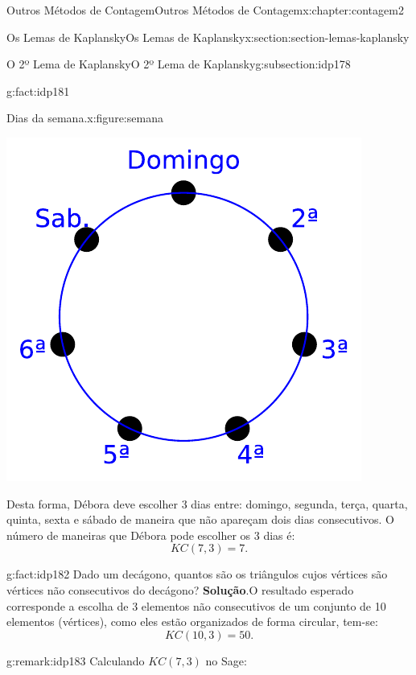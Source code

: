 \documentclass[oneside,10pt,]{book}
\newcommand{\blocktitlefont}{\relax}
\numberwithin{equation}{section}
\begin{document}
\begin{chapterptx}{Outros Métodos de Contagem}{}{Outros Métodos de Contagem}{}{}{x:chapter:contagem2}
\begin{sectionptx}{Os Lemas de Kaplansky}{}{Os Lemas de Kaplansky}{}{}{x:section:section-lemas-kaplansky}
\begin{subsectionptx}{O 2º Lema de Kaplansky}{}{O 2º Lema de Kaplansky}{}{}{g:subsection:idp178}
\begin{fact}{}{}{g:fact:idp181}
\begin{figureptx}{Dias da semana.}{x:figure:semana}{}%
\begin{image}{0.3}{0.4}{0.3}%
\includegraphics[width=\linewidth]{images/semana}
\end{image}%
\tcblower
\end{figureptx}%
Desta forma, Débora deve escolher 3 dias entre: domingo, segunda, terça, quarta, quinta, sexta e sábado de maneira que não apareçam dois dias consecutivos. O número de maneiras que Débora pode escolher os 3 dias é:%
\begin{equation*}
KC(7, 3) = 7.
\end{equation*}
%
\end{fact}
\begin{fact}{}{}{g:fact:idp182}%
Dado um decágono, quantos são os triângulos cujos vértices são vértices não consecutivos do decágono?%
\textbf{\blocktitlefont Solução}.\quad{}O resultado esperado corresponde a escolha de 3 elementos não consecutivos de um conjunto de 10 elementos (vértices), como eles estão organizados de forma circular, tem-se:%
\begin{equation*}
KC(10, 3) = 50.
\end{equation*}
%
\end{fact}
\begin{remark}{}{g:remark:idp183}%
Calculando \(KC(7, 3)\) no Sage:%
\begin{sageinput}

\end{sageinput}
\end{remark}
\end{subsectionptx}
\end{sectionptx}
\end{chapterptx}
\end{document}
